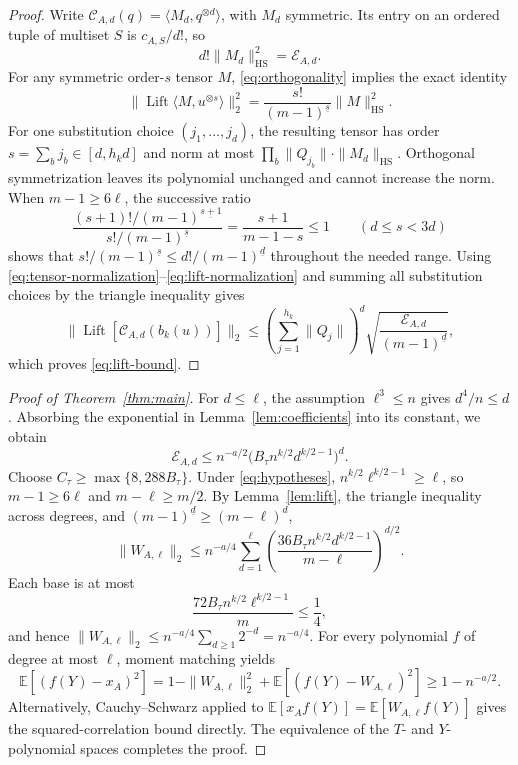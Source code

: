 \documentclass[11pt]{article}
\newcommand{\E}{\mathbb E}
\newcommand{\HS}{\mathrm{HS}}
\DeclareMathOperator{\Lift}{Lift}
\begin{document}
\begin{proof}
Write \(\mathcal C_{A,d}(q)=\langle M_d,q^{\otimes d}\rangle\), with \(M_d\) symmetric.
Its entry on an ordered tuple of multiset \(S\) is \(c_{A,S}/d!\), so
\begin{equation}\label{eq:tensor-normalization}
d!\|M_d\|_{\HS}^2=\mathcal E_{A,d}.
\end{equation}
For any symmetric order-\(s\) tensor \(M\), \eqref{eq:orthogonality} implies the exact identity
\begin{equation}\label{eq:lift-normalization}
\bigl\|\Lift\langle M,u^{\otimes s}\rangle\bigr\|_2^2
=\frac{s!}{(m-1)^{\underline s}}\|M\|_{\HS}^2.
\end{equation}
For one substitution choice \((j_1,\ldots,j_d)\), the resulting tensor has order \(s=\sum_bj_b\in[d,h_kd]\) and norm at most
\(\prod_b\|Q_{j_b}\|\cdot\|M_d\|_{\HS}\).
Orthogonal symmetrization leaves its polynomial unchanged and cannot increase the norm.
When \(m-1\ge6\ell\), the successive ratio
\[
\frac{(s+1)!/(m-1)^{\underline{s+1}}}{s!/(m-1)^{\underline s}}
=\frac{s+1}{m-1-s}\le1
\qquad(d\le s<3d)
\]
shows that \(s!/(m-1)^{\underline s}\le d!/(m-1)^{\underline d}\) throughout the needed range.
Using \eqref{eq:tensor-normalization}--\eqref{eq:lift-normalization} and summing all substitution choices by the triangle inequality gives
\[
\bigl\|\Lift[\mathcal C_{A,d}(b_k(u))]\bigr\|_2
\le
\left(\sum_{j=1}^{h_k}\|Q_j\|\right)^d
\sqrt{\frac{\mathcal E_{A,d}}{(m-1)^{\underline d}}},
\]
which proves \eqref{eq:lift-bound}.
\end{proof}

\begin{proof}[Proof of Theorem~\ref{thm:main}]
For \(d\le \ell\), the assumption \(\ell^3\le n\) gives \(d^4/n\le d\).
Absorbing the exponential in Lemma~\ref{lem:coefficients} into its constant, we obtain
\begin{equation}\label{eq:absorbed-bound}
\mathcal E_{A,d}
\le n^{-a/2}\bigl(B_\tau n^{k/2}d^{k/2-1}\bigr)^d.
\end{equation}
Choose \(C_\tau\ge\max\{8,288B_\tau\}\).
Under \eqref{eq:hypotheses}, \(n^{k/2}\ell^{k/2-1}\ge \ell\), so \(m-1\ge6\ell\) and \(m-\ell\ge m/2\).
By Lemma~\ref{lem:lift}, the triangle inequality across degrees, and
\((m-1)^{\underline d}\ge(m-\ell)^d\),
\begin{equation}\label{eq:geometric-bound}
\|W_{A,\ell}\|_2
\le n^{-a/4}
\sum_{d=1}^\ell
\left(
\frac{36B_\tau n^{k/2}d^{k/2-1}}{m-\ell}
\right)^{d/2}.
\end{equation}
Each base is at most
\[
\frac{72B_\tau n^{k/2}\ell^{k/2-1}}{m}\le\frac14,
\]
and hence \(\|W_{A,\ell}\|_2\le n^{-a/4}\sum_{d\ge1}2^{-d}=n^{-a/4}\).
For every polynomial \(f\) of degree at most \(\ell\), moment matching yields
\[
\E[(f(Y)-x_A)^2]
=1-\|W_{A,\ell}\|_2^2+\E[(f(Y)-W_{A,\ell})^2]
\ge1-n^{-a/2}.
\]
Alternatively, Cauchy--Schwarz applied to
\(\E[x_Af(Y)]=\E[W_{A,\ell}f(Y)]\)
gives the squared-correlation bound directly.
The equivalence of the \(T\)- and \(Y\)-polynomial spaces completes the proof.
\end{proof}
\end{document}
